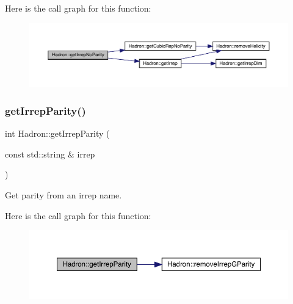 Here is the call graph for this function\+:\nopagebreak
\begin{figure}[H]
\begin{center}
\leavevmode
\includegraphics[width=350pt]{d1/daf/namespaceHadron_ae2543483bce4c1e4b6c9ca56d01fe9ac_cgraph}
\end{center}
\end{figure}
\mbox{\label{namespaceHadron_af182dccf3462f82247a3d86df38c2da0}} 
\subsubsection{\texorpdfstring{getIrrepParity()}{getIrrepParity()}}
{\footnotesize\ttfamily int Hadron\+::get\+Irrep\+Parity (\begin{DoxyParamCaption}\item[{const std\+::string \&}]{irrep }\end{DoxyParamCaption})}



Get parity from an irrep name. 

Here is the call graph for this function\+:\nopagebreak
\begin{figure}[H]
\begin{center}
\leavevmode
\includegraphics[width=350pt]{d1/daf/namespaceHadron_af182dccf3462f82247a3d86df38c2da0_cgraph}
\end{center}
\end{figure}
\mbox{\label{namespaceHadron_a0f40c5d7e590d17294e0a27e231c0a4b}} 
